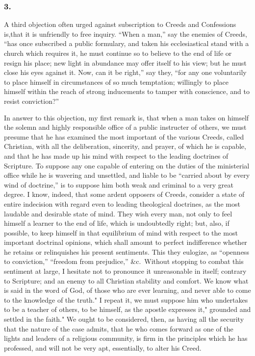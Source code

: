 \documentclass[
]{book}
\begin{document}
\hypertarget{section-9}{%
\subsubsection*{3.}\label{section-9}}

A third objection often urged against subscription to Creeds and Confessions is,that it is unfriendly to free inquiry. ``When a man,'' say the enemies of Creeds, ``has once subscribed a public formulary, and taken his ecclesiastical stand with a church which requires it, he must continue so to believe to the end of life or resign his place; new light in abundance may offer itself to his view; but he must close his eyes against it. Now, can it be right,'' say they, ``for any one voluntarily to place himself in circumstances of so much temptation; willingly to place himself within the reach of strong inducements to tamper with conscience, and to resist conviction?''

In answer to this objection, my first remark is, that when a man takes on himself the solemn and highly responsible office of a public instructer of others, we must presume that he has examined the most important of the various Creeds, called Christian, with all the deliberation, sincerity, and prayer, of which he is capable, and that he has made up his mind with respect to the leading doctrines of Scripture. To suppose any one capable of entering on the duties of the ministerial office while he is wavering and unsettled, and liable to be ``carried about by every wind of doctrine,'' is to suppose him both weak and criminal to a very great degree. I know, indeed, that some ardent opposers of Creeds, consider a state of entire indecision with regard even to leading theological doctrines, as the most laudable and desirable state of mind. They wish every man, not only to feel himself a learner to the end of life, which is undoubtedly right; but, also, if possible, to keep himself in that equilibrium of mind with respect to the most important doctrinal opinions, which shall amount to perfect indifference whether he retains or relinquishes his present sentiments. This they eulogize, as ``openness to conviction,'' ``freedom from prejudice,'' \&c.~Without stopping to combat this sentiment at large, I hesitate not to pronounce it unreasonable in itself; contrary to Scripture; and an enemy to all Christian stability and comfort. We know what is said in the word of God, of those who are ever learning, and never able to come to the knowledge of the truth." I repeat it, we must suppose him who undertakes to be a teacher of others, to be himself, as the apostle expresses it," grounded and settled in the faith." We ought to be considered, then, as having all the security that the nature of the case admits, that he who comes forward as one of the lights and leaders of a religious community, is firm in the principles which he has professed, and will not be very apt, essentially, to alter his Creed.
\end{document}
